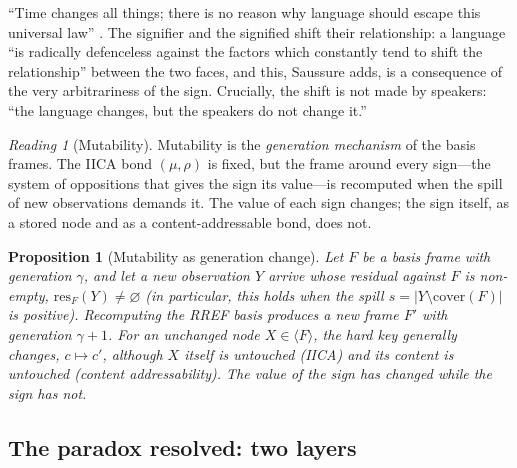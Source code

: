 \documentclass[11pt,a4paper]{article}
\newtheorem{proposition}[principle]{Proposition}
\theoremstyle{remark}
\newtheorem{reading}[principle]{Reading}
\newcommand{\res}{\ensuremath{\mathrm{res}}}             %
\newcommand{\spanof}[1]{\ensuremath{\langle #1\rangle}}  %
\newcommand{\Ing}{\ensuremath{\mu}}                      %
\newcommand{\Mat}{\ensuremath{\rho}}                     %
\newcommand{\Gen}{\ensuremath{\gamma}}                   %
\newcommand{\cover}{\ensuremath{\mathrm{cover}}}         %
\begin{document}
``Time changes all things; there is no reason why language should escape this
universal law'' \cite[Part I, ch.~II, \S3]{harris1983}. The signifier and the
signified shift their relationship: a language ``is radically defenceless
against the factors which constantly tend to shift the relationship'' between
the two faces, and this, Saussure adds, is a consequence of the very
arbitrariness of the sign. Crucially, the shift is not made by speakers: ``the
language changes, but the speakers do not change it.''

\begin{reading}[Mutability]
\label{read:mutability}
Mutability is the \emph{generation mechanism} of the basis frames. The IICA
bond $(\Ing,\Mat)$ is fixed, but the frame around every sign---the system of
oppositions that gives the sign its value---is recomputed when the spill of new
observations demands it. The value of each sign changes; the sign itself, as a
stored node and as a content-addressable bond, does not.
\end{reading}

\begin{proposition}[Mutability as generation change]
\label{prop:mutability}
Let $F$ be a basis frame with generation $\Gen$, and let a new observation
$Y$ arrive whose residual against $F$ is non-empty, $\res_F(Y) \neq
\varnothing$ (in particular, this holds when the spill
$s = |Y \setminus \cover(F)|$ is positive). Recomputing the RREF
basis produces a new frame $F'$ with generation $\Gen+1$. For an unchanged
node $X \in \spanof{F}$, the hard key generally changes, $c \mapsto c'$,
although $X$ itself is untouched (IICA) and its content is untouched
(content addressability). The \emph{value} of the sign has changed while the
\emph{sign} has not.
\end{proposition}

\subsection{The paradox resolved: two layers}
\label{sec:paradox}
\end{document}

